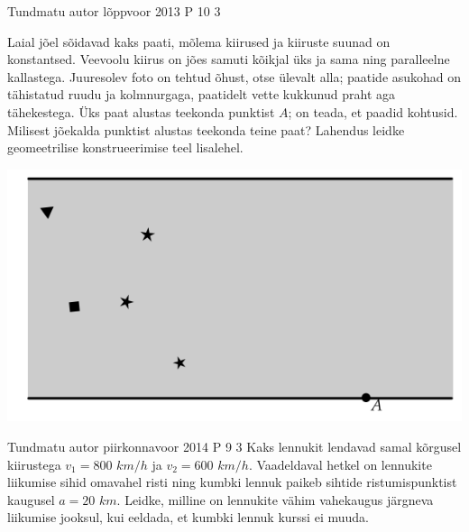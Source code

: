 \documentclass[11pt]{article}
\begin{document}
{%
{Tundmatu autor} %
{lõppvoor} %
{2013} %
{P 10} %
{3} %
{
\ifStatement
 Laial jõel sõidavad kaks paati, mõlema kiirused ja kiiruste suunad on konstantsed. Veevoolu kiirus on jões samuti kõikjal üks ja sama ning paralleelne kallastega. Juuresolev foto on tehtud õhust, otse ülevalt alla; paatide asukohad on tähistatud ruudu ja kolmnurgaga, paatidelt vette kukkunud praht aga tähekestega. Üks paat alustas teekonda punktist $A$; on teada, et paadid kohtusid. Milisest jõekalda punktist alustas teekonda teine paat? Lahendus leidke geomeetrilise konstrueerimise teel lisalehel.
\begin{center}
	\includegraphics[width=0.5\linewidth]{2013-v3p-10-yl.PNG}
\end{center}
\fi
}


{Tundmatu autor} %
{piirkonnavoor} %
{2014} %
{P 9} %
{3} %
{
\ifStatement
Kaks lennukit lendavad samal kõrgusel kiirustega $v_1 = 800$ $km/h$ ja $v_2 = 600$ $km/h$. Vaadeldaval hetkel on lennukite liikumise sihid omavahel risti ning kumbki lennuk paikeb sihtide ristumispunktist kaugusel $a = 20$ $km$. Leidke, milline on lennukite vähim vahekaugus järgneva liikumise jooksul, kui eeldada, et kumbki lennuk kurssi ei muuda.\fi
}

}
\end{document}
